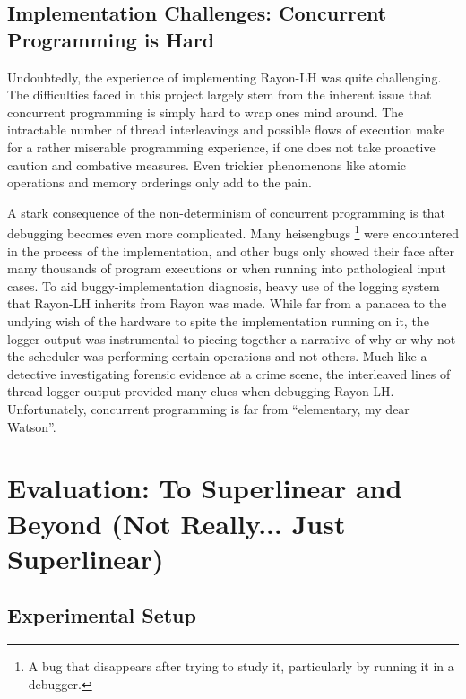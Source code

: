 \documentclass[bsc,frontabs,singlespacing,parskip,deptreport,normalheadings]{infthesis}
\begin{document}
\section{Implementation Challenges: Concurrent Programming is Hard}

Undoubtedly, the experience of implementing Rayon-LH was quite challenging.
The difficulties faced in this project largely stem from the inherent issue that
concurrent programming is simply hard to wrap ones mind around. The intractable
number of thread interleavings and possible flows of execution make for a rather
miserable programming experience, if one does not take proactive caution and
combative measures. Even trickier phenomenons like atomic operations and memory
orderings only add to the pain.

A stark consequence of the non-determinism of concurrent programming is that
debugging becomes even more complicated. Many heisengbugs \footnote{A bug that
disappears after trying to study it, particularly by running it in a debugger.}
were encountered in the process of the implementation, and other bugs only
showed their face after many thousands of program executions or when running
into pathological input cases. To aid buggy-implementation diagnosis, heavy use
of the logging system that Rayon-LH inherits from Rayon was made. While far from
a panacea to the undying wish of the hardware to spite the implementation
running on it, the logger output was instrumental to piecing together a
narrative of why or why not the scheduler was performing certain operations and
not others. Much like a detective investigating forensic evidence at a crime
scene, the interleaved lines of thread logger output provided many clues when
debugging Rayon-LH. Unfortunately, concurrent programming is far from
``elementary, my dear Watson''.


\chapter{Evaluation: To Superlinear and Beyond (Not Really... Just Superlinear)}
\label{chapter:evaluation:_to_superlinear_and_beyond_(not_really..._just_superlinear)}

\section{Experimental Setup}
\end{document}
